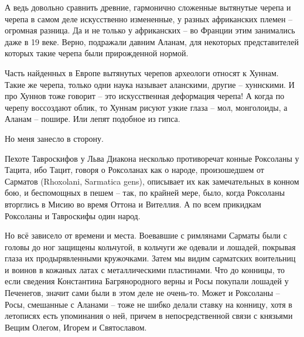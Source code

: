 

А ведь довольно сравнить древние, гармонично сложенные вытянутые черепа и черепа в самом деле искусственно измененные, у разных африканских племен – огромная разница. Да и не только у африканских – во Франции этим занимались даже в 19 веке. Верно, подражали давним Аланам, для некоторых представителей которых такие черепа были прирожденной нормой.

Часть найденных в Европе вытянутых черепов археологи относят к Хуннам. Такие же черепа, только одни наука называет аланскими, другие – хуннскими. И про Хуннов тоже говорит – это искусственная деформация черепа! А когда по черепу воссоздают облик, то Хуннам рисуют узкие глаза – мол, монголоиды, а Аланам – пошире. Или лепят подобное из гипса.
 
Но меня занесло в сторону.

Пехоте Тавроскифов у Льва Диакона несколько противоречат конные Роксоланы у Тацита, ибо Тацит, говоря о Роксоланах как о народе, произошедшем от Сарматов (Rhoxolani, Sarmatica gens), описывает их как замечательных в конном бою, и беспомощных в пешем – так, по крайней мере, было, когда Роксоланы вторглись в Мисию во время Оттона и Вителлия. А по всем прикидкам Роксоланы и Тавроскифы один народ.

Но всё зависело от времени и места. Воевавшие с римлянами Сарматы были с головы до ног защищены кольчугой, в кольчуги же одевали и лошадей, покрывая глаза их продырявленными кружочками. Затем мы видим сарматских воительниц и воинов в кожаных латах с металлическими пластинами. Что до конницы, то если сведения Константина Багрянородного верны и Росы покупали лошадей у Печенегов, значит сами были в этом деле не очень-то. Может и Роксоланы – Росы, смешанные с Аланами – тоже не шибко делали ставку на конницу, хотя в летописях есть упоминания о ней, причем в непосредственной связи с князьями Вещим Олегом, Игорем и Святославом. 

